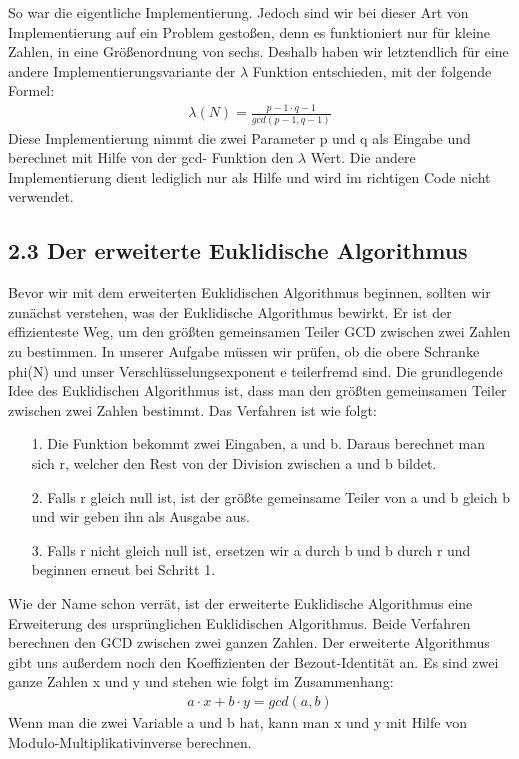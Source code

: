 \documentclass[course=asp]{aspdoc}
\begin{document}
So war die eigentliche Implementierung. Jedoch sind wir bei dieser Art von Implementierung auf ein Problem gestoßen, denn es funktioniert nur für kleine Zahlen, in eine Größenordnung von sechs. Deshalb haben wir letztendlich für eine andere Implementierungsvariante der $\lambda $ Funktion entschieden, mit der folgende Formel:
\begin{align}
	\lambda(N) = \frac{{p-1}\cdot{q-1}}{gcd(p-1, q-1)}
\end{align} 
Diese Implementierung nimmt die zwei Parameter p und q als Eingabe und berechnet mit Hilfe von der gcd- Funktion den $\lambda $ Wert. Die andere Implementierung dient lediglich nur als Hilfe und wird im richtigen Code nicht verwendet.
\subsection*{2.3 Der erweiterte Euklidische Algorithmus}
Bevor wir mit dem erweiterten Euklidischen Algorithmus beginnen, sollten wir zunächst verstehen, was der Euklidische Algorithmus bewirkt. Er ist der effizienteste Weg, um den größten gemeinsamen Teiler GCD zwischen zwei Zahlen zu bestimmen. In unserer Aufgabe müssen wir prüfen, ob die obere Schranke phi(N) und unser Verschlüsselungsexponent e teilerfremd sind. Die grundlegende Idee des Euklidischen Algorithmus ist, dass man den größten gemeinsamen Teiler zwischen zwei Zahlen bestimmt. Das Verfahren ist wie folgt:
\begin{itemize}
 \item [1.] Die Funktion bekommt zwei Eingaben, a und b. Daraus berechnet man sich r, welcher den Rest von der Division zwischen a und b bildet.
 \item [2.] Falls r gleich null ist, ist der größte gemeinsame Teiler von a und b gleich b und wir geben ihn als Ausgabe aus.
 \item [3.] Falls r nicht gleich null ist, ersetzen wir a durch b und b durch r und beginnen erneut bei Schritt 1. 
\end{itemize}
Wie der Name schon verrät, ist der erweiterte Euklidische Algorithmus eine Erweiterung des ursprünglichen Euklidischen Algorithmus. Beide Verfahren berechnen den GCD zwischen zwei ganzen Zahlen. Der erweiterte Algorithmus gibt uns außerdem noch den Koeffizienten der Bezout-Identität an. Es sind zwei ganze Zahlen x und y und stehen wie folgt im Zusammenhang:
\begin{align}
	a\cdot x + b\cdot y = gcd(a, b)
\end{align} 
Wenn man die zwei Variable a und b hat, kann man x und y mit Hilfe von Modulo-Multiplikativinverse berechnen.
\end{document}
